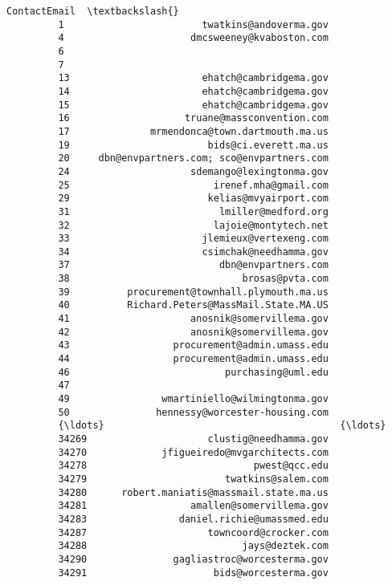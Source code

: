\documentclass[11pt]{article}
\begin{document}
\begin{Verbatim}[commandchars=\\\{\}]
                                            ContactEmail  \textbackslash{}
         1                        twatkins@andoverma.gov   
         4                      dmcsweeney@kvaboston.com   
         6                                                 
         7                                                 
         13                       ehatch@cambridgema.gov   
         14                       ehatch@cambridgema.gov   
         15                       ehatch@cambridgema.gov   
         16                    truane@massconvention.com   
         17              mrmendonca@town.dartmouth.ma.us   
         19                        bids@ci.everett.ma.us   
         20     dbn@envpartners.com; sco@envpartners.com   
         24                     sdemango@lexingtonma.gov   
         25                         irenef.mha@gmail.com   
         29                        kelias@mvyairport.com   
         31                          lmiller@medford.org   
         32                         lajoie@montytech.net   
         33                       jlemieux@vertexeng.com   
         34                       csimchak@needhamma.gov   
         37                          dbn@envpartners.com   
         38                              brosas@pvta.com   
         39          procurement@townhall.plymouth.ma.us   
         40          Richard.Peters@MassMail.State.MA.US   
         41                     anosnik@somervillema.gov   
         42                     anosnik@somervillema.gov   
         43                  procurement@admin.umass.edu   
         44                  procurement@admin.umass.edu   
         46                           purchasing@uml.edu   
         47                                                
         49                wmartiniello@wilmingtonma.gov   
         50               hennessy@worcester-housing.com   
         {\ldots}                                         {\ldots}   
         34269                     clustig@needhamma.gov   
         34270             jfigueiredo@mvgarchitects.com   
         34278                             pwest@qcc.edu   
         34279                        twatkins@salem.com   
         34280      robert.maniatis@massmail.state.ma.us   
         34281                  amallen@somervillema.gov   
         34283                daniel.richie@umassmed.edu   
         34287                     towncoord@crocker.com   
         34288                           jays@deztek.com   
         34290               gagliastroc@worcesterma.gov   
         34291                      bids@worcesterma.gov   

\end{Verbatim}
\end{document}
